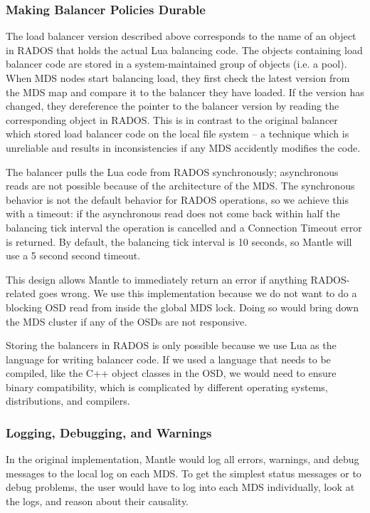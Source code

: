 \documentclass[10pt,twocolumn]{article}
\begin{document}
\subsubsection{Making Balancer Policies Durable}

The load balancer version described above corresponds to the name of an object
in RADOS that holds the actual Lua balancing code. The objects containing load
balancer code are stored in a system-maintained group of objects (i.e. a pool).
When MDS nodes start balancing load, they first check the latest version from
the MDS map and compare it to the balancer they have loaded. If the version has
changed, they dereference the pointer to the balancer version by reading the
corresponding object in RADOS. This is in contrast to the original balancer
which stored load balancer code on the local file system -- a technique which
is unreliable and results in inconsistencies if any MDS accidently modifies the
code.

The balancer pulls the Lua code from RADOS synchronously; asynchronous reads
are not possible because of the architecture of the MDS. The synchronous
behavior is not the default behavior for RADOS operations, so we achieve this
with a timeout: if the asynchronous read does not come back within half the
balancing tick interval the operation is cancelled and a Connection Timeout
error is returned. By default, the balancing tick interval is 10 seconds, so
Mantle will use a 5 second second timeout.

This design allows Mantle to immediately return an error if anything
RADOS-related goes wrong.  We use this implementation because we do not want to
do a blocking OSD read from inside the global MDS lock. Doing so would bring
down the MDS cluster if any of the OSDs are not responsive.

Storing the balancers in RADOS is only possible because we use Lua as the
language for writing balancer code. If we used a language that needs to be
compiled, like the C++ object classes in the OSD, we would need to ensure
binary compatibility, which is complicated by different operating systems,
distributions, and compilers.

\subsubsection{Logging, Debugging, and Warnings}

In the original implementation, Mantle would log all errors, warnings, and
debug messages to the local log on each MDS. To get the simplest status
messages or to debug problems, the user would have to log into each MDS
individually, look at the logs, and reason about their causality. 
\end{document}
